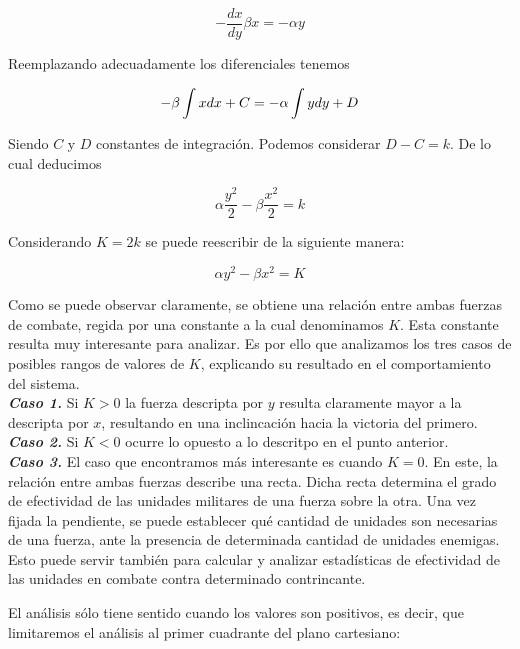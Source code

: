 \documentclass{sig-alternate}
\begin{document}
\begin{equation}
-\frac{d x}{d y}\beta x=-\alpha y\end{equation}


Reemplazando adecuadamente los diferenciales tenemos 

\begin{equation}
-\beta\intop x dx + C =-\alpha\int y dy + D\end{equation}


Siendo $C$ y $D$ constantes de integración. Podemos considerar $D - C = k$. De lo cual deducimos

\begin{equation}
\alpha\frac{y^{2}}{2}-\beta\frac{x^{2}}{2}=k\end{equation}


Considerando $K=2k$ se puede reescribir de la siguiente manera:

\begin{equation}
\alpha y^{2}-\beta x^{2}=K\label{eq:obtenida}\end{equation}


Como se puede observar claramente, se obtiene una relación entre ambas fuerzas de combate, regida por una constante a la cual denominamos $K$. 
Esta constante resulta muy interesante para analizar. Es por ello que analizamos los tres casos de posibles rangos de valores de $K$, explicando
su resultado en el comportamiento del sistema.\\
\textbf{\textit{Caso 1.}} Si $K>0$ la fuerza descripta por $y$ resulta claramente mayor a la descripta por $x$, resultando en una inclincación hacia la victoria
del primero.\\
\textbf{\textit{Caso 2.}} Si $K<0$ ocurre lo opuesto a lo descritpo en el punto anterior.\\
\textbf{\textit{Caso 3.}} El caso que encontramos más interesante es cuando $K=0$. En este, la relación entre ambas fuerzas describe una recta. 
Dicha recta determina el grado de efectividad de las unidades militares de una fuerza sobre la otra. Una vez fijada la pendiente, se puede 
establecer qué cantidad de unidades son necesarias de una fuerza, ante la presencia de determinada cantidad de unidades enemigas. Esto puede servir también
para calcular y analizar estadísticas de efectividad de las unidades en combate contra determinado contrincante.

El an\'alisis s\'olo tiene sentido cuando los valores son positivos, es
decir, que limitaremos el an\'alisis al primer cuadrante del plano
cartesiano:
\end{document}

